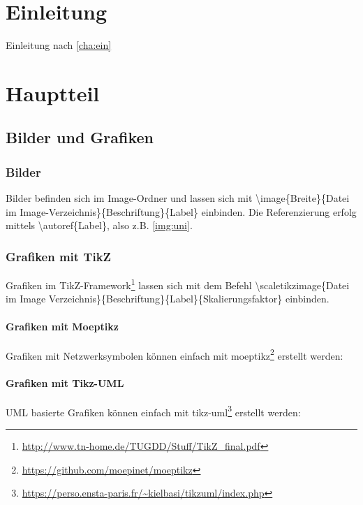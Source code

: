 \chapter{Einleitung}\label{cha:ein}
Einleitung nach \autoref{cha:ein}

\chapter{Hauptteil}\label{cha:haupt}
\section{Bilder und Grafiken}\label{sec:grafiken}

\subsection{Bilder}\label{subsec:bilder}
Bilder befinden sich im Image-Ordner und lassen sich mit \textbackslash image\{Breite\}\{Datei im Image-Verzeichnis\}\{Beschriftung\}\{Label\} einbinden.  Die Referenzierung erfolg mittels \textbackslash autoref\{Label\}, also z.B. \autoref{img:uni}.
\subsection{Grafiken mit TikZ}
Grafiken im TikZ-Framework\footnote{\url{http://www.tn-home.de/TUGDD/Stuff/TikZ_final.pdf}} lassen sich mit dem Befehl \textbackslash scaletikzimage\{Datei im Image Verzeichnis\}\{Beschriftung\}\{Label\}\{Skalierungsfaktor\} einbinden. 

\subsubsection{Grafiken mit Moeptikz}
Grafiken mit Netzwerksymbolen können einfach mit moeptikz\footnote{\url{https://github.com/moepinet/moeptikz}} erstellt werden:

\subsubsection{Grafiken mit Tikz-UML}
UML basierte Grafiken können einfach mit tikz-uml\footnote{\url{https://perso.ensta-paris.fr/~kielbasi/tikzuml/index.php}} erstellt werden:

